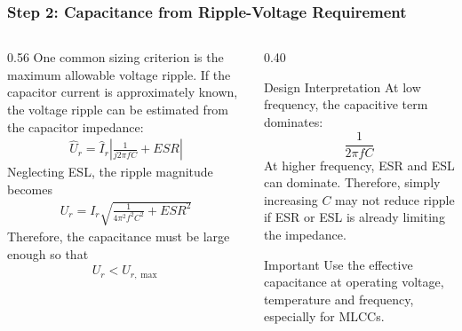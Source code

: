 \begin{frame}
\frametitle{Step 2: Capacitance from Ripple-Voltage Requirement}

\begin{columns}
\begin{column}{0.56\textwidth}
One common sizing criterion is the maximum allowable voltage ripple. If the capacitor current is approximately known, the voltage ripple can be estimated from the capacitor impedance:
\begin{align}
    \hat{U}_{r}
    =
    \hat{I}_{r}
    \left|
    \frac{1}{j2\pi f C}
    +
    ESR
    \right|
\end{align}
Neglecting ESL, the ripple magnitude becomes
\begin{align}
    U_r
    =
    I_r
    \sqrt{
    \frac{1}{4\pi^2 f^2 C^2}
    +
    ESR^2
    }
\end{align}
Therefore, the capacitance must be large enough so that
\begin{align}
    U_r < U_{r,\max}
\end{align}
\end{column}

\begin{column}{0.40\textwidth}
\begin{block}{Design Interpretation}
At low frequency, the capacitive term dominates:
\[
\frac{1}{2\pi f C}
\]
At higher frequency, ESR and ESL can dominate. Therefore, simply increasing \(C\) may not reduce ripple if ESR or ESL is already limiting the impedance.
\end{block}

\begin{block}{Important}
\small
Use the effective capacitance at operating voltage, temperature and frequency, especially for MLCCs.
\end{block}
\end{column}
\end{columns}
\end{frame}


